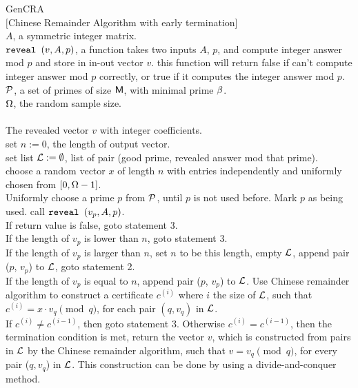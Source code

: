 \begin{algorithm} {GenCRA}\\
$[$Chinese Remainder Algorithm with early termination] 
\Inspec\\ 
  $A$, a symmetric integer matrix.\\
  $\mbox{\tt reveal }(v, A, p)$, a function takes two inputs $A$, $p$, and compute
  integer answer mod $p$ and store in in-out vector $v$.
  this function will return false if \reveal can't compute integer answer mod $p$ correctly,
  or true if it computes the integer answer mod $p$. \\
  $\mathcal P$, a set of primes of size $\mathsf M$, with minimal prime $\beta$.\\
  $\Omega$, the random sample size.\\
\Outspec\\
The revealed vector $v$ with integer coefficients. \\
\Stmt[1.]
set $n := 0$, the length of output vector.\\
set list $\mathcal L := \emptyset$, list of pair (good prime, revealed answer
 mod that prime).\\
\Stmt[2.]
choose a random vector $x$ of length $n$ with
entries independently and uniformly chosen 
from $[0, \Omega - 1]$.\\
\Stmt[3.]
Uniformly choose a prime $p$ from $\mathcal P$,
until $p$ is not used before. 
Mark $p$ as being used.
call $\mbox{\tt reveal }(v_p, A, p)$.\\ 
If return value is false, goto statement 3.\\
If the length of $v_p$ is lower than $n$, goto statement 3.\\
If the length of $v_p$ is larger than $n$, set $n$ to be this length,
empty $\mathcal L$, append pair ($p$, $v_p$) to $\mathcal L$, goto statement 2.\\
If the length of $v_p$ is equal to $n$, append pair ($p$, $v_p$) to $\mathcal L$.
Use Chinese remainder algorithm to construct 
a certificate $c^{(i)}$ where $i$ the size of $\mathcal L$, such that
$c^{(i)} = x \cdot v_{q} \pmod {q}$, for each pair $(q, v_q)$ in $\mathcal L$.\\
\Stmt[4.]
If $c^{(i)} \not= c^{(i-1)}$, then goto statement 3.
Otherwise $c^{(i)} = c^{(i-1)}$,
then the termination condition is met,
return the vector $v$, which is
constructed from pairs in $\mathcal L$ by the Chinese remainder algorithm,
such that $v = v_q \pmod q$, for every pair ($q, v_q$) in $\mathcal L$.
This construction can be done by using a divide-and-conquer method. 
\end{algorithm}
